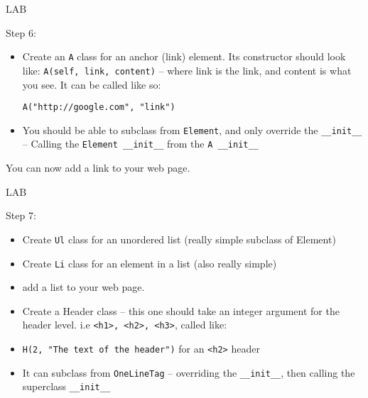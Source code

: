 \documentclass{beamer}
\begin{document}
\begin{frame}[fragile]{LAB}

{\Large Step 6:}

\begin{itemize}
   \item  Create an \verb|A| class for an anchor (link) element. Its constructor should
          look like: \verb|A(self, link, content)| -- where link is the link,
          and content is what you see. It can be called like so:

   \verb|A("http://google.com", "link")|

  \item You should be able to subclass from \verb|Element|, and only override
        the \verb|__init__|\\
        -- Calling the \verb|Element __init__| from the  \verb|A __init__|
\end{itemize}

\vfill
    You can now add a link to your web page.
\end{frame}

\begin{frame}[fragile]{LAB}

{\Large Step 7:}

\begin{itemize}
   \item Create \verb|Ul| class for an unordered list (really simple subclass of Element)
   
   \item Create \verb|Li| class for an element in a list (also really simple)
   
   \item add a list to your web page.
   
   \item Create a Header class -- this one should take an integer argument for the
   header level. i.e \verb|<h1>, <h2>, <h3>|, called like:
   
   \item \verb|H(2, "The text of the header")| for an \verb|<h2>| header
   
   \item It can subclass from \verb|OneLineTag| -- overriding the \verb|__init__|, then calling
       the superclass \verb|__init__|
\end{itemize}

\end{frame}
\end{document}
